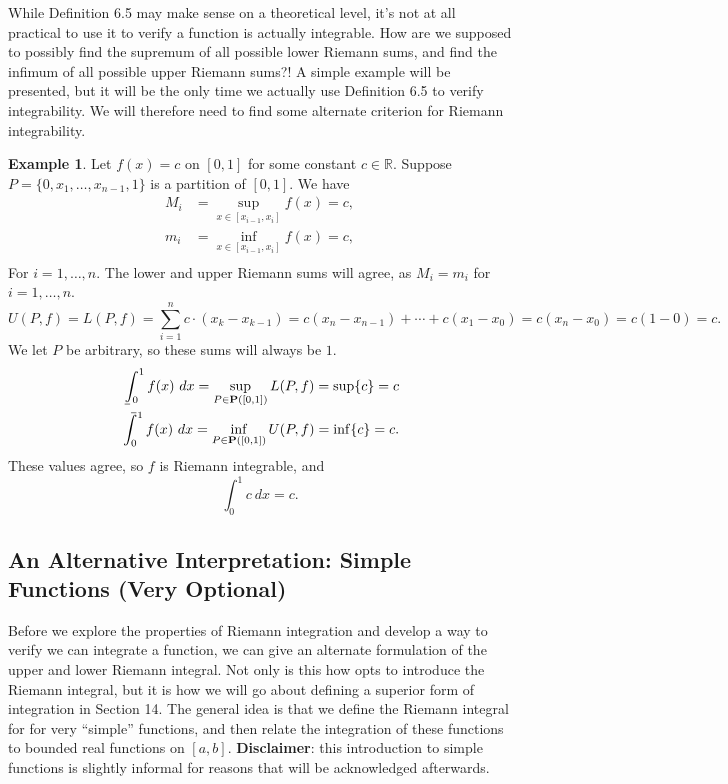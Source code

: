 \documentclass{article}
\def\upint{\mathchoice%
	{\mkern13mu\overline{\vphantom{\intop}\mkern7mu}\mkern-20mu}%
	{\mkern7mu\overline{\vphantom{\intop}\mkern7mu}\mkern-14mu}%
	{\mkern7mu\overline{\vphantom{\intop}\mkern7mu}\mkern-14mu}%
	{\mkern7mu\overline{\vphantom{\intop}\mkern7mu}\mkern-14mu}%
	\int}
\def\lowint{\mkern3mu\underline{\vphantom{\intop}\mkern7mu}\mkern-10mu\int}
\newcommand{\R}{\mathbb{R}}
\theoremstyle{definition}
\newtheorem{example}{Example}[section]
\begin{document}
	While Definition 6.5 may make sense on a theoretical level, it's not at all practical to use it to verify a function is actually integrable. How are we supposed to possibly find the supremum of all possible lower Riemann sums, and find the infimum of all possible upper Riemann sums?! A simple example will be presented, but it will be the only time we actually use Definition 6.5 to verify integrability. We will therefore need to find some alternate criterion for Riemann integrability.    
	\begin{example}
		Let $ f(x)=c $ on $ [0,1] $ for some constant $ c\in\R  $. Suppose $ P=\{0,x_1,\ldots,x_{n-1},1\} $ is a partition of $ [0,1] $. We have  \begin{align*}
			M_i&=\sup_{x\in[x_{i-1},x_i]} f(x)=c,\\
			m_i&=\inf_{x\in[x_{i-1},x_i]} f(x)=c,\\
		\end{align*} 
		For $ i=1,\ldots, n $. The lower and upper Riemann sums will agree, as $ M_i=m_i $ for $ i=1,\ldots, n $. $$ U(P,f)=L(P, f)=\sum_{i=1}^{n}c\cdot(x_k-x_{k-1})=c(x_n-x_{n-1})+\cdots +c(x_1-x_0)=c(x_n-x_0)=c(1-0)= c.$$ We let $ P $ be arbitrary, so these sums will always be $ 1 $.
		\begin{align*}
			\lowint_0^1 f(x)\ dx=\sup\limits_{P\in\textbf{P}([0,1])} L(P,f)=\sup\{c\}=c\\ \upint_0^1 f(x)\ dx =\inf\limits_{P\in\textbf{P}([0,1])} U(P,f)=\inf\{c\}=c.
		\end{align*}  
		These values agree, so $ f $ is Riemann integrable, and $$\int_{0}^{1} c\ dx=c .$$
	\end{example}
	\subsection{An Alternative Interpretation: Simple Functions (Very Optional)}
	Before we explore the properties of Riemann integration and develop a way to verify we can integrate a function, we can give an alternate formulation of the upper and lower Riemann integral. Not only is this  how \cite{tao2006analysis} opts to introduce the Riemann integral, but it is how we will go about defining a superior form of integration in Section 14. The general idea is that we define the Riemann integral for for very ``simple'' functions, and then relate the integration of these functions to bounded real functions on $ [a,b] $. \textbf{Disclaimer}: this introduction to simple functions is slightly informal for reasons that will be acknowledged afterwards. 
	
\end{document}
